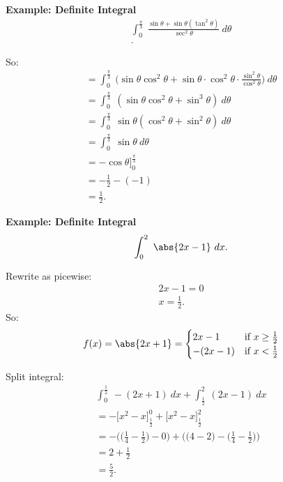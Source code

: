 \documentclass{report}
\begin{document}
\bigbreak \noindent 
\begin{mdframed}
  \textbf{Example: Definite Integral}
  \begin{align*}
    \int_{0}^{\frac{\pi}{3}}\ \frac{\sin{\theta  + \sin{\theta }(\tan^{2}{\theta })}}{\sec^{2}{\theta }}\ d\theta  \\
  .\end{align*}
\end{mdframed}
\bigbreak \noindent \bigbreak \noindent
So:
\begin{align*}
  = \int_{0}^{\frac{\pi}{3}}\ \bigg(\sin{\theta }\cos^{2}{\theta} + \sin{\theta}\cdot \cos^{2}{\theta}\cdot \frac{\sin^{2}{\theta }}{\cos^{2}{\theta }}\bigg)\ d\theta  \\
  = \int_{0}^{\frac{\pi}{3}}\ (\sin{\theta }\cos^{2}{\theta } + \sin^{3}{\theta})\ d\theta  \\
  = \int_{0}^{\frac{\pi}{3}}\ \sin{\theta }(\cos^{2}{\theta } + \sin^{2}{\theta })\ d\theta  \\
  = \int_{0}^{\frac{\pi}{3}}\ \sin{\theta } \ d\theta  \\
= -\cos{\theta }\bigg]_{0}^{\frac{\pi}{3}} \\
= -\frac{1}{2}- (-1) \\
\boxed{=\frac{1}{2}}
.\end{align*}

\pagebreak \bigbreak \noindent
\begin{mdframed}
  \textbf{Example: Definite Integral}
  \begin{align*}
    \int_{0}^{2}\ \abs{2x-1}\ dx
  .\end{align*} 
\end{mdframed}

\bigbreak \noindent \bigbreak \noindent
Rewrite as picewise:
\begin{align*}
  2x-1 = 0 \\
  x = \frac{1}{2}
.\end{align*}
\bigbreak \noindent \bigbreak \noindent
So:
\begin{equation}
  f(x) = \abs{2x+1}=
  \begin{cases}
    2x-1 & \text{if }  x \geq \frac{1}{2}\\
    -(2x-1) & \text{if } x < \frac{1}{2} 
  \end{cases}
\end{equation}

\bigbreak \noindent \bigbreak \noindent
Split integral:
\begin{align*}
  \int_{0}^{\frac{1}{2}}\ -(2x+1)\ dx + \int_{\frac{1}{2}}^{2}\ (2x-1)\ dx \\
  = -\bigg[x^{2}-x\bigg]_{\frac{1}{2}}^{0} + \bigg[x^{2}-x\bigg]_{\frac{1}{2}}^{2} \\
  = -\bigg(\bigg(\frac{1}{4}-\frac{1}{2}\bigg)-0\bigg)+\bigg(\bigg(4-2\bigg)-\bigg(\frac{1}{4}-\frac{1}{2}\bigg)\bigg) \\
  = 2+\frac{1}{2}\\
  \boxed{=\frac{5}{2}}
.\end{align*}
\end{document}
